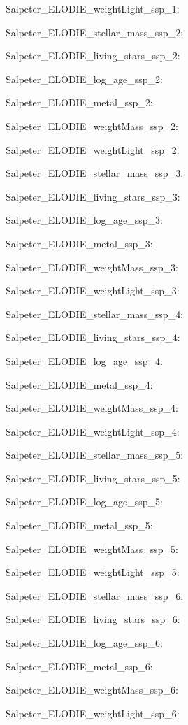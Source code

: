 \item Salpeter\_ELODIE\_weightLight\_ssp\_1: 
\item Salpeter\_ELODIE\_stellar\_mass\_ssp\_2: 
\item Salpeter\_ELODIE\_living\_stars\_ssp\_2: 
\item Salpeter\_ELODIE\_log\_age\_ssp\_2: 
\item Salpeter\_ELODIE\_metal\_ssp\_2: 
\item Salpeter\_ELODIE\_weightMass\_ssp\_2: 
\item Salpeter\_ELODIE\_weightLight\_ssp\_2: 
\item Salpeter\_ELODIE\_stellar\_mass\_ssp\_3: 
\item Salpeter\_ELODIE\_living\_stars\_ssp\_3: 
\item Salpeter\_ELODIE\_log\_age\_ssp\_3: 
\item Salpeter\_ELODIE\_metal\_ssp\_3: 
\item Salpeter\_ELODIE\_weightMass\_ssp\_3: 
\item Salpeter\_ELODIE\_weightLight\_ssp\_3: 
\item Salpeter\_ELODIE\_stellar\_mass\_ssp\_4: 
\item Salpeter\_ELODIE\_living\_stars\_ssp\_4: 
\item Salpeter\_ELODIE\_log\_age\_ssp\_4: 
\item Salpeter\_ELODIE\_metal\_ssp\_4: 
\item Salpeter\_ELODIE\_weightMass\_ssp\_4: 
\item Salpeter\_ELODIE\_weightLight\_ssp\_4: 
\item Salpeter\_ELODIE\_stellar\_mass\_ssp\_5: 
\item Salpeter\_ELODIE\_living\_stars\_ssp\_5: 
\item Salpeter\_ELODIE\_log\_age\_ssp\_5: 
\item Salpeter\_ELODIE\_metal\_ssp\_5: 
\item Salpeter\_ELODIE\_weightMass\_ssp\_5: 
\item Salpeter\_ELODIE\_weightLight\_ssp\_5: 
\item Salpeter\_ELODIE\_stellar\_mass\_ssp\_6: 
\item Salpeter\_ELODIE\_living\_stars\_ssp\_6: 
\item Salpeter\_ELODIE\_log\_age\_ssp\_6: 
\item Salpeter\_ELODIE\_metal\_ssp\_6: 
\item Salpeter\_ELODIE\_weightMass\_ssp\_6: 
\item Salpeter\_ELODIE\_weightLight\_ssp\_6: 
